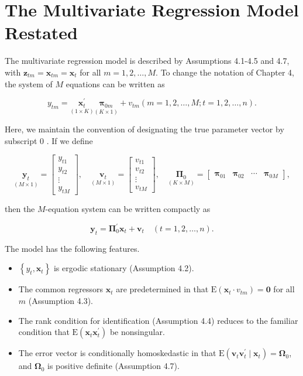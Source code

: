 \documentclass[10pt]{article}
\begin{document}
\section*{The Multivariate Regression Model Restated}
The multivariate regression model is described by Assumptions 4.1-4.5 and 4.7, with $\mathbf{z}_{t m}=\mathbf{x}_{t m}=\mathbf{x}_{t}$ for all $m=1,2, \ldots, M$. To change the notation of Chapter 4, the system of $M$ equations can be written as


\begin{equation*}
y_{t m}=\underset{(1 \times K)}{\mathbf{x}_{t}^{\prime}} \underset{(K \times 1)}{\boldsymbol{\pi}_{0 m}}+v_{t m}(m=1,2, \ldots, M ; t=1,2, \ldots, n) . \tag{8.4.1}
\end{equation*}


Here, we maintain the convention of designating the true parameter vector by subscript 0 . If we define

\[
\underset{(M \times 1)}{\mathbf{y}_{t}}=\left[\begin{array}{c}
y_{t 1}  \tag{8.4.2}\\
y_{t 2} \\
\vdots \\
y_{t M}
\end{array}\right], \quad \underset{(M \times 1)}{\mathbf{v}_{t}}=\left[\begin{array}{c}
v_{t 1} \\
v_{t 2} \\
\vdots \\
v_{t M}
\end{array}\right], \quad \underset{(K \times M)}{\boldsymbol{\Pi}_{0}}=\left[\begin{array}{llll}
\boldsymbol{\pi}_{01} & \boldsymbol{\pi}_{02} & \cdots & \boldsymbol{\pi}_{0 M}
\end{array}\right],
\]

then the $M$-equation system can be written compactly as


\begin{equation*}
\mathbf{y}_{t}=\mathbf{\Pi}_{0}^{\prime} \mathbf{x}_{t}+\mathbf{v}_{t} \quad(t=1,2, \ldots, n) . \tag{8.4.3}
\end{equation*}


The model has the following features.

\begin{itemize}
  \item $\left\{y_{t}, \mathbf{x}_{t}\right\}$ is ergodic stationary (Assumption 4.2).
  \item The common regressors $\mathbf{x}_{t}$ are predetermined in that $\mathrm{E}\left(\mathbf{x}_{t} \cdot v_{t m}\right)=\mathbf{0}$ for all $m$ (Assumption 4.3).
  \item The rank condition for identification (Assumption 4.4) reduces to the familiar condition that $\mathrm{E}\left(\mathbf{x}_{t} \mathbf{x}_{t}^{\prime}\right)$ be nonsingular.
  \item The error vector is conditionally homoskedastic in that $\mathrm{E}\left(\mathbf{v}_{t} \mathbf{v}_{t}^{\prime} \mid \mathbf{x}_{t}\right)=\boldsymbol{\Omega}_{0}$, and $\mathbf{\Omega}_{0}$ is positive definite (Assumption 4.7).
\end{itemize}
\end{document}
